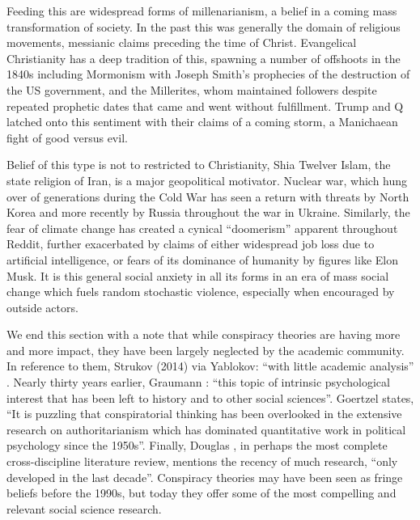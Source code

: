 Feeding this are widespread forms of millenarianism, a belief in a coming mass transformation of society.
In the past this was generally the domain of religious movements, messianic claims preceding the time of Christ.
Evangelical Christianity has a deep tradition of this, spawning a number of offshoots in the 1840s including Mormonism with Joseph Smith's prophecies of the destruction of the US government, and the Millerites, whom maintained followers despite repeated prophetic dates that came and went without fulfillment.
Trump and Q latched onto this sentiment with their claims of a coming storm, a Manichaean fight of good versus evil.

Belief of this type is not to restricted to Christianity, Shia Twelver Islam, the state religion of Iran, is a major geopolitical motivator.
Nuclear war, which hung over of generations during the Cold War has seen a return with threats by North Korea and more recently by Russia throughout the war in Ukraine.
Similarly, the fear of climate change has created a cynical ``doomerism'' apparent throughout Reddit, further exacerbated by claims of either widespread job loss due to artificial intelligence, or fears of its dominance of humanity by figures like Elon Musk.
It is this general social anxiety in all its forms in an era of mass social change which fuels random stochastic violence, especially when encouraged by outside actors.

We end this section with a note that while conspiracy theories are having more and more impact, they have been largely neglected by the academic community.
In reference to them, Strukov (2014) via Yablokov: ``with little academic analysis'' \cite{yablokov2015}.
Nearly thirty years earlier, Graumann \citeyear[p. 245]{graumann1987}: ``this topic of intrinsic psychological interest that has been left to history and to other social sciences''.  
Goertzel \citeyear{goertzel1994} states, ``It is puzzling that conspiratorial thinking has been overlooked in the extensive research on authoritarianism which has dominated quantitative work in political psychology since the 1950s''.
Finally, Douglas \citeyear{douglas2019}, in perhaps the most complete cross-discipline literature review, mentions the recency of much research, ``only developed in the last decade''.
Conspiracy theories may have been seen as fringe beliefs before the 1990s, but today they offer some of the most compelling and relevant social science research.
